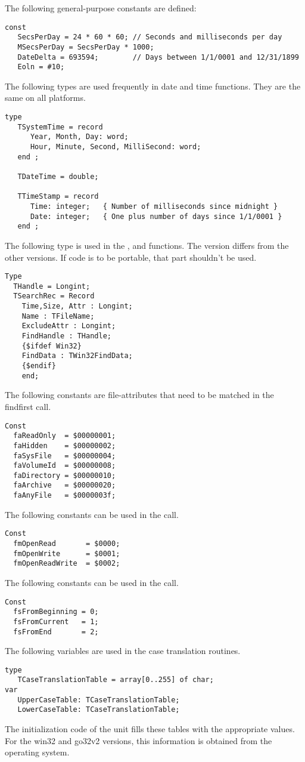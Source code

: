 The following general-purpose constants are defined:
\begin{verbatim}
const
   SecsPerDay = 24 * 60 * 60; // Seconds and milliseconds per day
   MSecsPerDay = SecsPerDay * 1000;
   DateDelta = 693594;        // Days between 1/1/0001 and 12/31/1899
   Eoln = #10;
\end{verbatim}
The following types are used frequently in date and time functions.
They are the same on all platforms.
\begin{verbatim}
type
   TSystemTime = record
      Year, Month, Day: word;
      Hour, Minute, Second, MilliSecond: word;
   end ;

   TDateTime = double;

   TTimeStamp = record
      Time: integer;   { Number of milliseconds since midnight }
      Date: integer;   { One plus number of days since 1/1/0001 }
   end ;
\end{verbatim}
The following type is used in the , 
and  functions. The  version differs from 
the other versions. If code is to be portable, that part  shouldn't 
be used.
\begin{verbatim}
Type 
  THandle = Longint; 
  TSearchRec = Record
    Time,Size, Attr : Longint;
    Name : TFileName;
    ExcludeAttr : Longint;
    FindHandle : THandle;
    {$ifdef Win32}
    FindData : TWin32FindData;        
    {$endif}
    end;
\end{verbatim}
The following constants are file-attributes that need to be matched in the 
findfirst call.
\begin{verbatim}
Const 
  faReadOnly  = $00000001; 
  faHidden    = $00000002;
  faSysFile   = $00000004;
  faVolumeId  = $00000008;
  faDirectory = $00000010;
  faArchive   = $00000020;
  faAnyFile   = $0000003f;
\end{verbatim}
The following constants can be used in the  call.
\begin{verbatim}
Const
  fmOpenRead       = $0000;
  fmOpenWrite      = $0001;
  fmOpenReadWrite  = $0002;
\end{verbatim}
The following constants can be used in the  call.
\begin{verbatim}
Const
  fsFromBeginning = 0;
  fsFromCurrent   = 1;
  fsFromEnd       = 2;

\end{verbatim}
The following variables are used in the case translation routines.
\begin{verbatim}
type
   TCaseTranslationTable = array[0..255] of char;
var
   UpperCaseTable: TCaseTranslationTable;
   LowerCaseTable: TCaseTranslationTable;
\end{verbatim}
The initialization code of the  unit fills these 
tables with the appropriate values. For the win32 and go32v2
versions, this information is obtained from the operating system.

